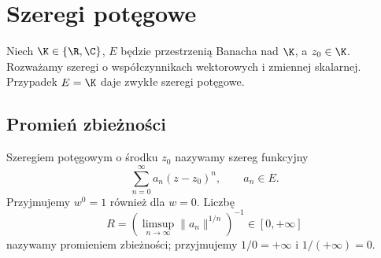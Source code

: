 \chapter{Szeregi potęgowe}
\label{ma2:ch:power-series}

Niech $\K\in\{\R,\C\}$, $E$ będzie przestrzenią
Banacha nad $\K$, a $z_0\in\K$. Rozważamy szeregi
o współczynnikach wektorowych i zmiennej skalarnej.
Przypadek $E=\K$ daje zwykłe szeregi potęgowe.

\section{Promień zbieżności}

\begin{definicja}
\label{ma2:def:power-series}
Szeregiem potęgowym o środku $z_0$ nazywamy
szereg funkcyjny
\[
 \sum_{n=0}^\infty a_n(z-z_0)^n,\qquad a_n\in E.
\]
Przyjmujemy $w^0=1$ również dla $w=0$.
Liczbę
\[
 R=\left(\limsup_{n\to\infty}\|a_n\|^{1/n}\right)^{-1}
 \in[0,+\infty]
\]
nazywamy promieniem zbieżności; przyjmujemy
$1/0=+\infty$ i $1/(+\infty)=0$.
\end{definicja}

